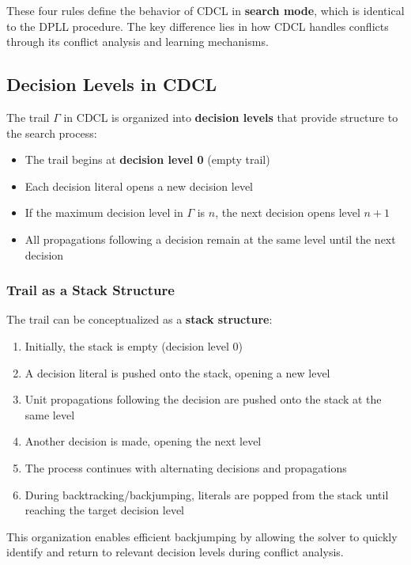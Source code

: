\documentclass[11pt,a4paper]{article}
\theoremstyle{definition}
\theoremstyle{plain}
\theoremstyle{remark}
\begin{document}
These four rules define the behavior of CDCL in \textbf{search mode}, which is identical to the DPLL procedure. The key difference lies in how CDCL handles conflicts through its conflict analysis and learning mechanisms.

\subsection{Decision Levels in CDCL}

The trail $\varGamma$ in CDCL is organized into \textbf{decision levels} that provide structure to the search process:

\begin{itemize}
    \item The trail begins at \textbf{decision level 0} (empty trail)
    \item Each decision literal opens a new decision level
    \item If the maximum decision level in $\varGamma$ is $n$, the next decision opens level $n+1$
    \item All propagations following a decision remain at the same level until the next decision
\end{itemize}

\subsubsection{Trail as a Stack Structure}

The trail can be conceptualized as a \textbf{stack structure}:

\begin{enumerate}
    \item Initially, the stack is empty (decision level 0)
    \item A decision literal is pushed onto the stack, opening a new level
    \item Unit propagations following the decision are pushed onto the stack at the same level
    \item Another decision is made, opening the next level
    \item The process continues with alternating decisions and propagations
    \item During backtracking/backjumping, literals are popped from the stack until reaching the target decision level
\end{enumerate}

This organization enables efficient backjumping by allowing the solver to quickly identify and return to relevant decision levels during conflict analysis.
\end{document}
